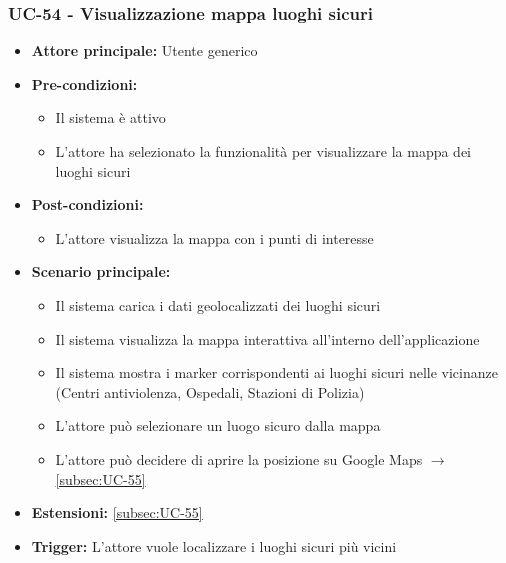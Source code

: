 \documentclass[a4paper,12pt]{article}
\begin{document}
\subsubsection{UC-54 - Visualizzazione mappa luoghi sicuri} \label{sec:UC-54}
\begin{itemize}
    \item \textbf{Attore principale:} Utente generico
    \item \textbf{Pre-condizioni:}
    \begin{itemize}
        \item Il sistema è attivo
        \item L'attore ha selezionato la funzionalità per visualizzare la mappa dei luoghi sicuri
    \end{itemize}
    \item \textbf{Post-condizioni:}
    \begin{itemize}
        \item L'attore visualizza la mappa con i punti di interesse
    \end{itemize}
    \item \textbf{Scenario principale:} 
    \begin{itemize}
        \item Il sistema carica i dati geolocalizzati dei luoghi sicuri
        \item Il sistema visualizza la mappa interattiva all'interno dell'applicazione
        \item Il sistema mostra i marker corrispondenti ai luoghi sicuri nelle vicinanze (Centri antiviolenza, Ospedali, Stazioni di Polizia)
        \item L'attore può selezionare un luogo sicuro dalla mappa
        \item L'attore può decidere di aprire la posizione su Google Maps $\rightarrow$ \ref{subsec:UC-55}
    \end{itemize}
    \item \textbf{Estensioni:} \ref{subsec:UC-55}
    \item \textbf{Trigger:} L'attore vuole localizzare i luoghi sicuri più vicini
\end{itemize}
\end{document}
